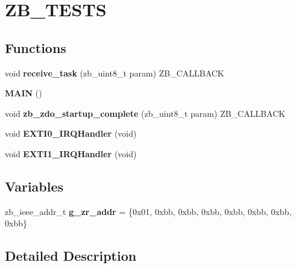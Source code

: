 \hypertarget{group__ZB__TESTS}{}\section{Z\+B\+\_\+\+T\+E\+S\+TS}
\label{group__ZB__TESTS}
\subsection*{Functions}
\begin{DoxyCompactItemize}
\item 
\mbox{\label{group__ZB__TESTS_gaa0d16838777ff39bc325cfb256899a0f}} 
void {\bfseries receive\+\_\+task} (zb\+\_\+uint8\+\_\+t param) Z\+B\+\_\+\+C\+A\+L\+L\+B\+A\+CK
\item 
\mbox{\label{group__ZB__TESTS_ga9b0391c94abcdf28fbc68d7b674e6ffe}} 
{\bfseries M\+A\+IN} ()
\item 
\mbox{\label{group__ZB__TESTS_ga03baac8a16440e90c699a5a17124b3c5}} 
void {\bfseries zb\+\_\+zdo\+\_\+startup\+\_\+complete} (zb\+\_\+uint8\+\_\+t param) Z\+B\+\_\+\+C\+A\+L\+L\+B\+A\+CK
\item 
\mbox{\label{group__ZB__TESTS_ga17e9789a29a87d2df54f12b94dd1a0b6}} 
void {\bfseries E\+X\+T\+I0\+\_\+\+I\+R\+Q\+Handler} (void)
\item 
\mbox{\label{group__ZB__TESTS_ga49cfdd46eb8d0ef3e1987514aa9343dc}} 
void {\bfseries E\+X\+T\+I1\+\_\+\+I\+R\+Q\+Handler} (void)
\end{DoxyCompactItemize}
\subsection*{Variables}
\begin{DoxyCompactItemize}
\item 
\mbox{\label{group__ZB__TESTS_ga5d3434c9c9bc4fdac4caa0b14e924b76}} 
zb\+\_\+ieee\+\_\+addr\+\_\+t {\bfseries g\+\_\+zr\+\_\+addr} = \{0x01, 0xbb, 0xbb, 0xbb, 0xbb, 0xbb, 0xbb, 0xbb\}
\end{DoxyCompactItemize}


\subsection{Detailed Description}
